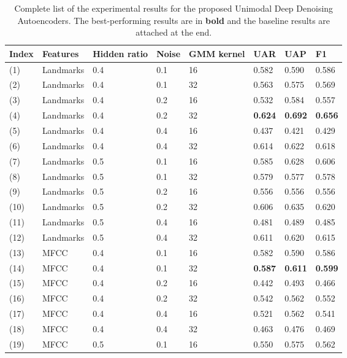 \begin{table}[htb]
    \centering
    \small
    \caption{Complete list of the experimental results for the proposed Unimodal Deep Denoising Autoencoders. The best-performing results are in \textbf{bold} and the baseline results are attached at the end.}
    \begin{tabular}{l|l|p{1.25cm}|l|p{1.2cm}|l|l|l}
        \Xhline{2\arrayrulewidth}
        Index & Features & Hidden ratio & Noise & GMM kernel & UAR & UAP & F1 \\
        \hline
        (1) & Landmarks & 0.4 & 0.1 & 16 & 0.582 & 0.590 & 0.586 \\
        (2) & Landmarks & 0.4 & 0.1 & 32 & 0.563 & 0.575 & 0.569 \\
        (3) & Landmarks & 0.4 & 0.2 & 16 & 0.532 & 0.584 & 0.557 \\
        (4) & Landmarks & 0.4 & 0.2 & 32 & \textbf{0.624} & \textbf{0.692} & \textbf{0.656} \\
        (5) & Landmarks & 0.4 & 0.4 & 16 & 0.437 & 0.421 & 0.429 \\
        (6) & Landmarks & 0.4 & 0.4 & 32 & 0.614 & 0.622 & 0.618 \\
        (7) & Landmarks & 0.5 & 0.1 & 16 & 0.585 & 0.628 & 0.606 \\
        (8) & Landmarks & 0.5 & 0.1 & 32 & 0.579 & 0.577 & 0.578 \\
        (9) & Landmarks & 0.5 & 0.2 & 16 & 0.556 & 0.556 & 0.556 \\
        (10) & Landmarks & 0.5 & 0.2 & 32 & 0.606 & 0.635 & 0.620 \\
        (11) & Landmarks & 0.5 & 0.4 & 16 & 0.481 & 0.489 & 0.485 \\
        (12) & Landmarks & 0.5 & 0.4 & 32 & 0.611 & 0.620 & 0.615 \\
        \hline
        (13) & MFCC & 0.4 & 0.1 & 16 & 0.582 & 0.590 & 0.586 \\
        (14) & MFCC & 0.4 & 0.1 & 32 & \textbf{0.587} & \textbf{0.611} & \textbf{0.599} \\
        (15) & MFCC & 0.4 & 0.2 & 16 & 0.442 & 0.493 & 0.466 \\
        (16) & MFCC & 0.4 & 0.2 & 32 & 0.542 & 0.562 & 0.552 \\
        (17) & MFCC & 0.4 & 0.4 & 16 & 0.521 & 0.562 & 0.541 \\
        (18) & MFCC & 0.4 & 0.4 & 32 & 0.463 & 0.476 & 0.469 \\
        (19) & MFCC & 0.5 & 0.1 & 16 & 0.550 & 0.575 & 0.562 \\

\end{tabular}
\end{table}
